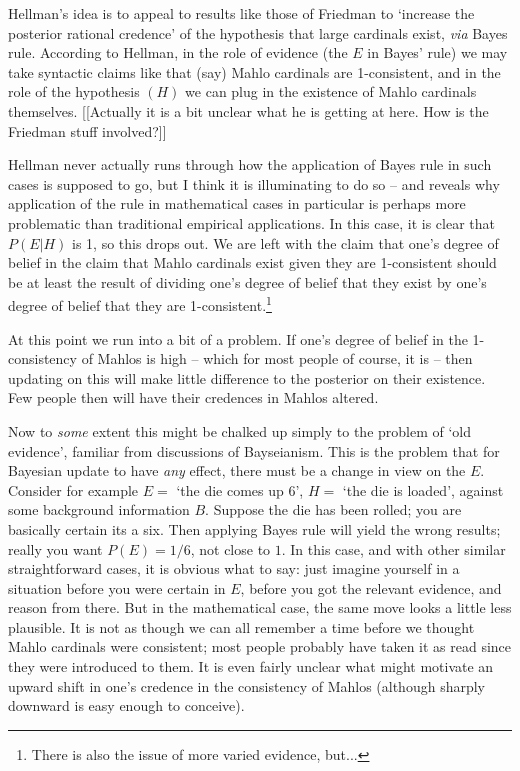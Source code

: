 \documentclass{asl}
\theoremstyle{definition}
\begin{document}
Hellman's idea is to appeal to results like those of Friedman to `increase the posterior rational credence' of the hypothesis that large cardinals exist, \emph{via}  Bayes rule. According to Hellman, in the role of evidence (the $E$ in Bayes' rule) we may take syntactic claims like that (say) Mahlo cardinals are 1-consistent, and in the role of the hypothesis  $(H)$ we can plug in the existence of Mahlo cardinals themselves. [[Actually it is a bit unclear what he is getting at here. How is the Friedman stuff involved?]]

Hellman never actually runs through how the application of Bayes rule in such cases is supposed to go, but I think it is illuminating to do so -- and reveals why application of the rule in mathematical cases in particular is perhaps more problematic than traditional empirical applications. In this case, it is clear that $P(E|H)$ is 1, so this drops out. We are left with the claim that one's degree of belief in the claim that Mahlo cardinals exist given they are 1-consistent should be at least the result of dividing one's degree of belief that they exist by one's degree of belief that they are 1-consistent.\footnote{There is also the issue of more varied evidence, but...}

At this point we run into a bit of a problem. If one's degree of belief in the 1-consistency of Mahlos is high -- which for most people of course, it is -- then updating on this will make little difference to the posterior on their existence. Few people then will have their credences in Mahlos altered.

Now to \emph{some} extent this might be chalked up simply to the problem of `old evidence', familiar from discussions of Bayseianism. This is the problem that for Bayesian update to have \emph{any} effect, there must be a change in view on the $E$. Consider for example $E =$ `the die comes up 6', $H =$ `the die is loaded', against some background information $B$. Suppose the die has been rolled; you are basically certain its a six. Then applying Bayes rule will yield the wrong results; really you want $P(E) = 1/6$, not close to $1$. In this case, and with other similar straightforward cases, it is obvious what to say: just imagine yourself in a situation before you were certain in $E$, before you got the relevant evidence, and reason from there. But in the mathematical case, the same move looks a little less plausible. It is not as though we can all remember a time before we thought Mahlo cardinals were consistent; most people probably have taken it as read since they were introduced to them. It is even fairly unclear what might motivate an upward shift in one's credence in the consistency of Mahlos (although sharply downward is easy enough to conceive).
\end{document}
